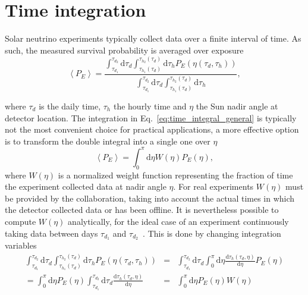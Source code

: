 \documentclass{article}
\newcommand{\de}[0]{\text{d}}
\begin{document}
\section{Time integration}
Solar neutrino experiments typically collect data over a finite interval of time. As such, the measured survival probability is averaged over exposure
\begin{equation}\label{eq:time_integral_general}
	\left< P_E \right> = \frac{\int_{\tau_{d_1}}^{\tau_{d_2}} \de \tau_d \int_{\tau_{h_1} (\tau_d)}^{\tau_{h_2} (\tau_d)} \de \tau_h P_E \left(\eta(\tau_d, \tau_h) \right)}{\int_{\tau_{d_1}}^{\tau_{d_2}} \de \tau_d \int_{\tau_{h_1} (\tau_d)}^{\tau_{h_2} (\tau_d)} \de \tau_h },
\end{equation}

where $\tau_d$ is the daily time, $\tau_h$ the hourly time and $\eta$ the Sun nadir angle at detector location. The integration in Eq.~\ref{eq:time_integral_general} is typically not the most convenient choice for practical applications, a more effective option is to transform the double integral into a single one over $\eta$~\cite{Lisi:1997yc}
\begin{equation}
	\left< P_E \right> = \int_{0}^{\pi} \de \eta W(\eta) P_E(\eta),
\end{equation}
where $W(\eta)$ is a normalized weight function representing the fraction of time the experiment collected data at nadir angle $\eta$.
For real experiments $W(\eta)$ must be provided by the collaboration, taking into account the actual times in which the detector collected data or has been offline. It is nevertheless possible to compute $W(\eta)$ analytically, for the ideal case of an experiment continuously taking data between days $\tau_{d_1}$ and $\tau_{d_2}$~\cite{Lisi:1997yc}.
This is done by changing integration variables
\begin{eqnarray}
	\int_{\tau_{d_1}}^{\tau_{d_2}} \de \tau_d \int_{\tau_{h_1} (\tau_d)}^{\tau_{h_2} (\tau_d)} \de \tau_h P_E \left(\eta(\tau_d, \tau_h) \right) &=& \int_{\tau_{d_1}}^{\tau_{d_2}} \de \tau_d \int_{0}^{\pi} \de \eta \frac{\de \tau_h (\tau_d, \eta)}{\de \eta} P_E \left(\eta \right) \\
	= \int_{0}^{\pi} \de \eta  P_E \left(\eta \right) \int_{\tau_{d_1}}^{\tau_{d_2}} \de \tau_d \frac{\de \tau_h (\tau_d, \eta)}{\de \eta} &=& \int_{0}^{\pi} \de \eta P_E(\eta) W(\eta) \label{eq:integral_W}
\end{eqnarray}
\end{document}
